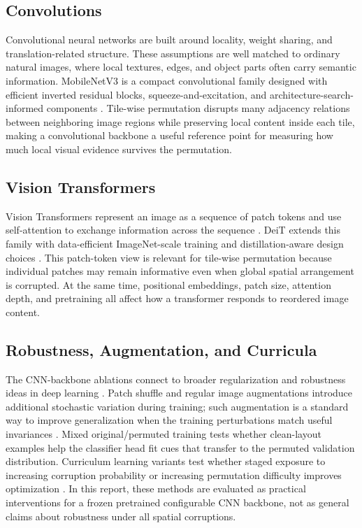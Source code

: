 \documentclass[12pt]{article}
\begin{document}
\subsection{Convolutions}

Convolutional neural networks are built around locality, weight sharing, and translation-related structure. These assumptions are well matched to ordinary natural images, where local textures, edges, and object parts often carry semantic information. MobileNetV3 is a compact convolutional family designed with efficient inverted residual blocks, squeeze-and-excitation, and architecture-search-informed components \citep{howard2019searching}. Tile-wise permutation disrupts many adjacency relations between neighboring image regions while preserving local content inside each tile, making a convolutional backbone a useful reference point for measuring how much local visual evidence survives the permutation.

\subsection{Vision Transformers}

Vision Transformers represent an image as a sequence of patch tokens and use self-attention to exchange information across the sequence \citep{dosovitskiy2021image}. DeiT extends this family with data-efficient ImageNet-scale training and distillation-aware design choices \citep{touvron2021deit}. This patch-token view is relevant for tile-wise permutation because individual patches may remain informative even when global spatial arrangement is corrupted. At the same time, positional embeddings, patch size, attention depth, and pretraining all affect how a transformer responds to reordered image content.

\subsection{Robustness, Augmentation, and Curricula}

The CNN-backbone ablations connect to broader regularization and robustness ideas in deep learning \citep{goodfellow2016deep}. Patch shuffle and regular image augmentations introduce additional stochastic variation during training; such augmentation is a standard way to improve generalization when the training perturbations match useful invariances \citep{shorten2019survey}. Mixed original/permuted training tests whether clean-layout examples help the classifier head fit cues that transfer to the permuted validation distribution. Curriculum learning variants test whether staged exposure to increasing corruption probability or increasing permutation difficulty improves optimization \citep{bengio2009curriculum}. In this report, these methods are evaluated as practical interventions for a frozen pretrained configurable CNN backbone, not as general claims about robustness under all spatial corruptions.
\end{document}
